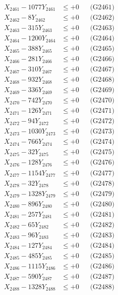 \documentclass[a4paper,10pt]{article}
\begin{document}
{\begin{align}
\allowbreak
X_{2461} - 1077Y_{2461} &\leq +0 && \text{(G2461)} \\
X_{2462} - 8Y_{2462} &\leq +0 && \text{(G2462)} \\
X_{2463} - 315Y_{2463} &\leq +0 && \text{(G2463)} \\
X_{2464} - 1200Y_{2464} &\leq +0 && \text{(G2464)} \\
X_{2465} - 388Y_{2465} &\leq +0 && \text{(G2465)} \\
X_{2466} - 281Y_{2466} &\leq +0 && \text{(G2466)} \\
X_{2467} - 310Y_{2467} &\leq +0 && \text{(G2467)} \\
X_{2468} - 932Y_{2468} &\leq +0 && \text{(G2468)} \\
X_{2469} - 336Y_{2469} &\leq +0 && \text{(G2469)} \\
X_{2470} - 742Y_{2470} &\leq +0 && \text{(G2470)} \\
\allowbreak
X_{2471} - 126Y_{2471} &\leq +0 && \text{(G2471)} \\
X_{2472} - 94Y_{2472} &\leq +0 && \text{(G2472)} \\
X_{2473} - 1030Y_{2473} &\leq +0 && \text{(G2473)} \\
X_{2474} - 766Y_{2474} &\leq +0 && \text{(G2474)} \\
X_{2475} - 32Y_{2475} &\leq +0 && \text{(G2475)} \\
X_{2476} - 128Y_{2476} &\leq +0 && \text{(G2476)} \\
X_{2477} - 1154Y_{2477} &\leq +0 && \text{(G2477)} \\
X_{2478} - 32Y_{2478} &\leq +0 && \text{(G2478)} \\
X_{2479} - 1328Y_{2479} &\leq +0 && \text{(G2479)} \\
X_{2480} - 896Y_{2480} &\leq +0 && \text{(G2480)} \\
\allowbreak
X_{2481} - 257Y_{2481} &\leq +0 && \text{(G2481)} \\
X_{2482} - 65Y_{2482} &\leq +0 && \text{(G2482)} \\
X_{2483} - 96Y_{2483} &\leq +0 && \text{(G2483)} \\
X_{2484} - 127Y_{2484} &\leq +0 && \text{(G2484)} \\
X_{2485} - 485Y_{2485} &\leq +0 && \text{(G2485)} \\
X_{2486} - 1115Y_{2486} &\leq +0 && \text{(G2486)} \\
X_{2487} - 590Y_{2487} &\leq +0 && \text{(G2487)} \\
X_{2488} - 1328Y_{2488} &\leq +0 && \text{(G2488)} \\

\end{align}}
\end{document}
